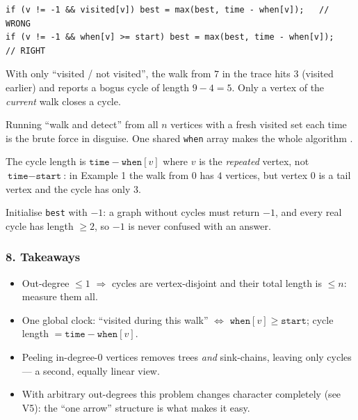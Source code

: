 \begin{warningbox}
\begin{lstlisting}[style=snippet]
if (v != -1 && visited[v]) best = max(best, time - when[v]);   // WRONG
if (v != -1 && when[v] >= start) best = max(best, time - when[v]);   // RIGHT
\end{lstlisting}
With only ``visited / not visited'', the walk from $7$ in the trace hits $3$ (visited earlier) and reports a bogus cycle of length $9 - 4 = 5$. Only a vertex of the \emph{current} walk closes a cycle.
\end{warningbox}

\begin{warningbox}
Running ``walk and detect'' from all $n$ vertices with a fresh visited set each time is the  brute force in disguise. One shared \texttt{when} array makes the whole algorithm .
\end{warningbox}

\begin{warningbox}
The cycle length is $\texttt{time} - \texttt{when}[v]$ where $v$ is the \emph{repeated} vertex, not $\texttt{time} - \texttt{start}$: in Example 1 the walk from $0$ has $4$ vertices, but vertex $0$ is a tail vertex and the cycle has only $3$.
\end{warningbox}

\begin{warningbox}
Initialise \texttt{best} with $-1$: a graph without cycles must return $-1$, and every real cycle has length $\ge 2$, so $-1$ is never confused with an answer.
\end{warningbox}

\subsubsection*{8. Takeaways}

\begin{itemize}[leftmargin=*]
    \item Out-degree $\le 1$ $\Rightarrow$ cycles are vertex-disjoint and their total length is $\le n$: measure them all.
    \item One global clock: ``visited during this walk'' $\Leftrightarrow$ $\texttt{when}[v] \ge \texttt{start}$; cycle length $= \texttt{time} - \texttt{when}[v]$.
    \item Peeling in-degree-0 vertices removes trees \emph{and} sink-chains, leaving only cycles --- a second, equally linear view.
    \item With arbitrary out-degrees this problem changes character completely (see V5): the ``one arrow'' structure is what makes it easy.
\end{itemize}

